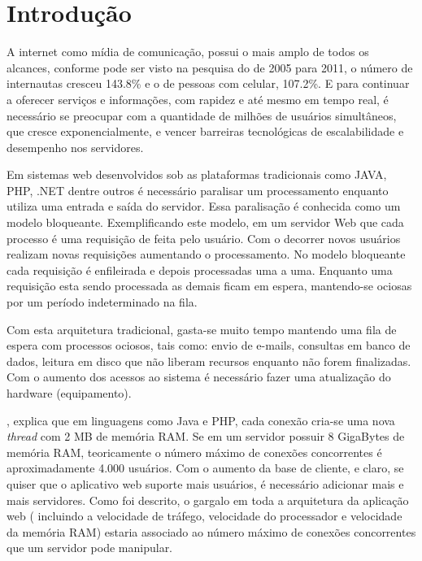 \chapter{Introdução}
\label{introducao}

\vspace{-1.9cm}

  
  A internet como mídia de comunicação, possui o mais amplo de todos os alcances, 
  conforme pode ser visto na pesquisa do  de 2005 para 2011, 
  o número de internautas cresceu 143.8\%  e o de pessoas com celular, 107.2\%. 
  E para continuar a oferecer serviços e informações, com rapidez e até mesmo em tempo real, 
  é necessário se preocupar com a quantidade de milhões de usuários simultâneos, 
  que cresce exponencialmente, e vencer barreiras tecnológicas de escalabilidade e desempenho nos servidores.
  
  Em sistemas web desenvolvidos sob as plataformas tradicionais como JAVA, \ac{PHP}, .NET dentre outros 
  é necessário paralisar um processamento enquanto utiliza uma entrada e saída do servidor. 
  Essa paralisação é conhecida como um modelo bloqueante. Exemplificando este modelo, em um servidor Web 
  que cada processo é uma requisição de feita pelo usuário. Com o decorrer novos usuários realizam novas 
  requisições aumentando o processamento. No modelo bloqueante cada requisição é enfileirada e depois 
  processadas uma a uma. Enquanto uma requisição esta sendo processada as demais ficam em espera, 
  mantendo-se ociosas por um período indeterminado na fila.\cite{Pereira:2013}
  
  Com esta arquitetura tradicional, gasta-se muito tempo mantendo uma fila de espera com processos ociosos,
  tais como: envio de e-mails, consultas em banco de dados, leitura em disco que não liberam recursos enquanto
  não forem finalizadas. Com o aumento dos acessos ao sistema é necessário fazer uma atualização
  do hardware (equipamento).\cite{Pereira:2013}
  
  , explica que em linguagens como Java e PHP, cada conexão cria-se uma 
  nova \textit{thread} com 2 MB de memória RAM. Se em um servidor possuir 8 GigaBytes de memória RAM, 
  teoricamente o número máximo de conexões concorrentes é aproximadamente 4.000 usuários. 
  Com o aumento da base de cliente, e claro, se quiser que o aplicativo web suporte mais usuários, é necessário 
  adicionar mais e mais servidores. Como foi descrito, o gargalo em toda a arquitetura 
  da aplicação web ( incluindo a velocidade de tráfego, velocidade do processador e velocidade da memória RAM) 
  estaria associado ao número máximo de conexões concorrentes que um servidor pode manipular.
  
